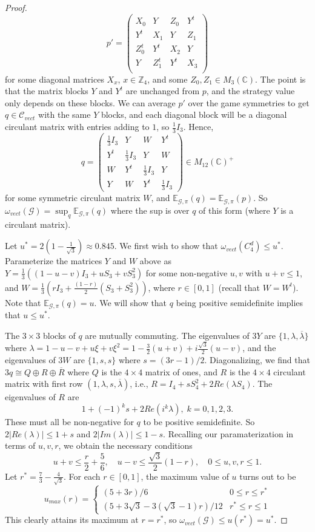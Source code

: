 \documentclass[10pt,a4paper]{amsart}
\newcommand{\bb}[1]{\mathbb{#1}}
\newcommand{\cl}[1]{\mathcal{#1}}
\begin{document}
\begin{proof}
  \[ p'
    =
    \begin{pmatrix}
      X_0&Y&Z_0&Y^t\\
      Y^t&X_1&Y&Z_1\\
      Z_0^t&Y^t&X_2&Y\\
      Y&Z_1^t&Y^t&X_3\\
    \end{pmatrix}
  \]
  for some diagonal matrices $X_x$, $x\in \bb Z_4$, and some
  $Z_0,Z_1\in M_3(\bb C)$. The point is that the matrix blocks $Y$ and $Y^t$ are
  unchanged from $p$, and the strategy value only depends on these blocks. We
  can average $p'$ over the game symmetries to get $q\in \cl C_{vect}$ with the
  same $Y$ blocks, and each diagonal block will be a diagonal
  circulant matrix with entries adding to $1$, so $\tfrac13 I_3$. Hence,
  \[ q=
    \begin{pmatrix}
      \tfrac13I_3&Y&W&Y^t\\
      Y^t&\tfrac13I_3&Y&W\\
      W&Y^t&\tfrac13I_3&Y\\
      Y&W&Y^t&\tfrac13I_3
    \end{pmatrix}\in  M_{12}(\bb C)^+\]
  for some symmetric circulant matrix $W$, and $\bb E_{\cl G,\pi}(q)=\bb E_{\cl G,\pi}(p)$. So
  $\omega_{vect}(\cl G)=\sup_q\bb E_{\cl G,\pi}(q)$ where the sup is over $q$ of this form (where $Y$ is a circulant matrix). %

  Let $u^*=2(1-\frac1{\sqrt3})\approx 0.845$. We first wish to show that $\omega_{vect}(C_4^d)\le u^*$.  Parameterize the matrices $Y$ and $W$ above as $Y=\tfrac13((1-u-v)I_3+uS_3+vS_3^2)$ for some non-negative $u,v$ with $u+v\le 1$, and $W=\tfrac13(rI_3+\frac{(1-r)}2(S_3+S_3^2))$, where $r\in [0,1]$ (recall that $W=W^t$). Note that $\bb E_{\cl G,\pi}(q)=u$. We will show that $q$ being positive semidefinite implies that $u\le u^*$.

  The $3\times 3$ blocks of $q$ are mutually commuting. The eigenvalues of $3Y$ are $\{1,\lambda,\overline{\lambda}\}$ where $\lambda=1-u-v+u\xi+v\xi^2=1-\frac32(u+v)+i\frac{\sqrt{3}}2(u-v)$, and the eigenvalues of $3W$ are $\{1,s,s\}$ where $s=(3r-1)/2$. Diagonalizing, we find that $3q\cong Q \oplus R\oplus \overline{R}$ where $Q$ is the $4\times 4$ matrix of ones, and $R$ is the $4\times 4$ circulant matrix with first row $(1,\lambda,s,\overline{\lambda})$, i.e., $R=I_4+sS_4^2+2Re(\lambda S_4)$. The eigenvalues of $R$ are
  \[
    1+(-1)^ks+2Re(i^k\lambda),\; k=0,1,2,3.
  \]
  These must all be non-negative for $q$ to be positive semidefinite.
  So $2|Re(\lambda)|\le 1+s$ and $2|Im(\lambda)|\le 1-s$.
  Recalling our paramaterization in terms of $u,v,r$, we obtain the necessary conditions
  \[ u+v\le \frac r2+\frac56,\quad u-v\le \frac{\sqrt{3}}2(1-r),\quad 0\le u,v,r\le 1.\]
  Let $r^*=\frac73-\frac4{\sqrt3}$. For each $r\in [0,1]$, the maximum value of $u$ turns out to be
  \[
    u_{max}(r)=\begin{cases}
      (5+3 r)/6&0\le r\le r^*\\
      (5+3\sqrt{3}-3(\sqrt{3}-1)r)/12&r^*\le r\le 1
    \end{cases}
  \]
  This clearly attains its maximum at $r=r^*$, so $\omega_{vect}(\mathcal{G})\le u(r^*)=u^*$.


\end{proof}
\end{document}
